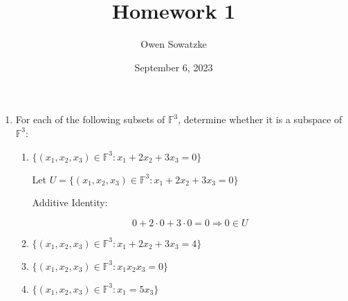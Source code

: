 \documentclass{article}
\title{Homework 1}
\author{Owen Sowatzke}
\date{September 6, 2023}
\begin{document}
	\maketitle
	\begin{enumerate}
	
		\item For each of the following subsets of $\mathbb{F}^3$, determine whether it is a subspace of $\mathbb{F}^3$:
		
		\begin{enumerate}
		
			\item ${\{(x_1, x_2, x_3) \in \mathbb{F}^3 : x_1 + 2x_2 + 3x_3 = 0 \}}$
			
			Let $U = {\{(x_1, x_2, x_3) \in \mathbb{F}^3 : x_1 + 2x_2 + 3x_3 = 0 \}}$
			
			Additive Identity:
			
			$$ 0 + 2 \cdot 0 + 3 \cdot 0 = 0 \Rightarrow 0 \in U $$
			\item ${\{(x_1, x_2, x_3) \in \mathbb{F}^3 : x_1 + 2x_2 + 3x_3 = 4 \}}$
			\item ${\{(x_1, x_2, x_3) \in \mathbb{F}^3 : x_1x_2x_3 = 0 \}}$
			\item ${\{(x_1, x_2, x_3) \in \mathbb{F}^3 : x_1 = 5x_3 \}}$
		\end{enumerate}
	\end{enumerate}
\end{document}
